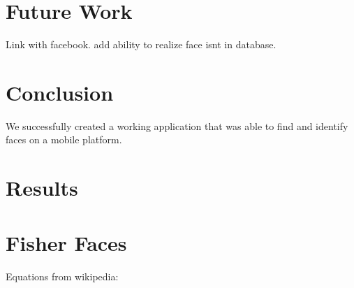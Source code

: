 

\section{Future Work} %


Link with facebook.
add ability to realize face isnt in database.

\section{Conclusion}


We successfully created a working application that was able to find
and identify faces on a mobile platform.


\section{Results}




\section{Fisher Faces}

Equations from wikipedia:

